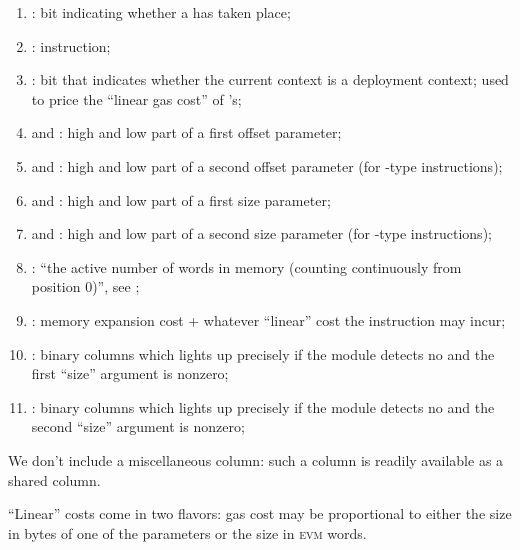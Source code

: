 \begin{enumerate}[resume]
	\item \miscMxpMxpx{}:
		bit indicating whether a \mxpxSH{} has taken place;
	\item \miscMxpInst{}:
		\mxpMod{} instruction; 
	\item \miscMxpCodeDeployment{}:
		bit that indicates whether the current context is a deployment context; used to price the ``linear gas cost'' of 's;
	\item \miscMxpOffsetOneHi{} and \miscMxpOffsetOneLo{}:
		high and low part of a first offset parameter;
	\item \miscMxpOffsetTwoHi{} and \miscMxpOffsetTwoLo{}:
		high and low part of a second offset parameter (for -type instructions);
	\item \miscMxpSizeOneHi{} and \miscMxpSizeOneLo{}:
		high and low part of a first size parameter;
	\item \miscMxpSizeTwoHi{} and \miscMxpSizeTwoLo{}:
		high and low part of a second size parameter (for -type instructions);
	\item \miscMxpWords{}:
		``the active number of words in memory (counting continuously from position $0$)'', see \cite{EYP-London};
	\item \miscMxpGasMxp{}:
		memory expansion cost + whatever ``linear'' cost the instruction may incur;
	\item \miscMxpSizeOneNonzeroNoMxpx{}:
		binary columns which lights up precisely if the \mxpMod{} module detects no \mxpxSH{} and the first ``size'' argument is nonzero;
	\item \miscMxpSizeTwoNonzeroNoMxpx{}:
		binary columns which lights up precisely if the \mxpMod{} module detects no \mxpxSH{} and the second ``size'' argument is nonzero;
\end{enumerate}
\saNote{} We don't include a miscellaneous \mxpStamp{} column: such a column is readily available as a shared column.

\saNote{} ``Linear'' costs come in two flavors: gas cost may be proportional to either the size in bytes of one of the parameters or the size in \textsc{evm} words.
